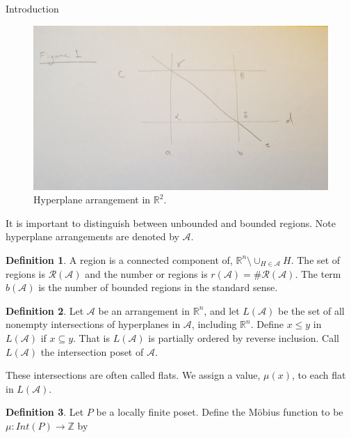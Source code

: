 \documentclass[a4paper,12pt]{article}
\theoremstyle{definition}
\newtheorem{definition}{Definition}[section]
\theoremstyle{indented}
\begin{document}
\begin{section}{Introduction}
\begin{figure}[H]
    \centering
 \includegraphics[scale=0.10,angle=0]{29072020 pics/fig 1.jpg}  
    \caption{Hyperplane arrangement in $\mathbb{R}^2$.}
    \label{fig 1}
\end{figure}

It is important to distinguish between unbounded and bounded regions. Note hyperplane arrangements are denoted by $\mathcal{A}$.

\begin{definition}
A region is a connected component of,
        $\mathbb{R}^n \setminus \cup_{H \in \mathcal{A}} H$. The set of regions is $\mathcal{R}(\mathcal{A})$ and the number or regions is $r(\mathcal{A})=\#\mathcal{R}(\mathcal{A})$. The term $b(\mathcal{A})$ is the number of bounded regions in the standard sense. 

\end{definition}

 \begin{definition}\label{Intposet}
 Let $\mathcal{A}$ be an arrangement in $\mathbb{R}^n$, and let $L(\mathcal{A})$ be the set of all nonempty intersections of hyperplanes in $\mathcal{A}$, including $\mathbb{R}^n$. Define $x \le y $ in $L(\mathcal{A})$ if $x \subseteq y$. That is $L(\mathcal{A})$ is partially ordered by reverse inclusion. Call $L(\mathcal{A})$ the intersection poset of $\mathcal{A}$.
 \end{definition}
 
 These intersections are often called flats. We assign a value, $\mu(x)$, to each flat in $L(\mathcal{A})$.

\begin{definition}\label{mob} Let $P$ be a locally finite poset. Define the Möbius function to be $\mu : Int(P) \rightarrow \mathbb{Z}$ by 


\end{definition}
\end{section}
\end{document}
